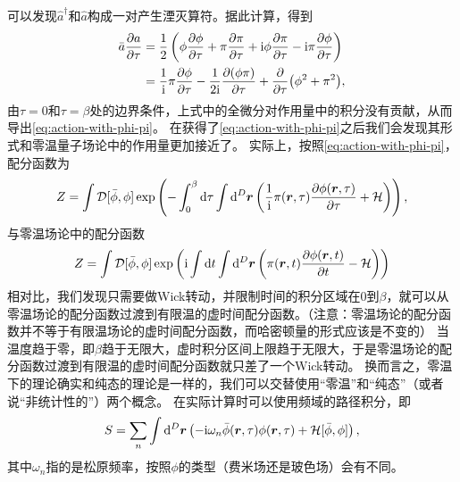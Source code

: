 \documentclass[hyperref, UTF8, a4paper]{ctexart}
\newcommand*{\ii}{\mathrm{i}}
\newcommand*{\fd}[1]{\mathcal{D}{#1}}
\begin{document}
可以发现$\hat{a}^\dagger$和$\hat{a}$构成一对产生湮灭算符。据此计算，得到
\[
    \begin{aligned}
        \bar{a} \pdv{a}{\tau} &= \frac{1}{2} \left( \phi \pdv{\phi}{\tau} + \pi \pdv{\pi}{\tau} + \ii \phi \pdv{\pi}{\tau} - \ii \pi \pdv{\phi}{\tau} \right) \\
        &= \frac{1}{\ii} \pi \pdv{\phi}{\tau} - \frac{1}{2\ii} \pdv{(\phi \pi)}{\tau} + \pdv{\tau} (\phi^2 + \pi^2), 
    \end{aligned}
\]
由$\tau=0$和$\tau=\beta$处的边界条件，上式中的全微分对作用量中的积分没有贡献，从而导出\eqref{eq:action-with-phi-pi}。
在获得了\eqref{eq:action-with-phi-pi}之后我们会发现其形式和零温量子场论中的作用量更加接近了。
实际上，按照\eqref{eq:action-with-phi-pi}，配分函数为
\begin{equation}
    Z = \int \fd{[\bar{\phi}, \phi]} \exp \left( - \int_0^\beta \dd{\tau} \int \dd[D]{\vb*{r}} \left( \frac{1}{\ii} \pi(\vb*{r}, \tau) \pdv{\phi(\vb*{r}, \tau)}{\tau} + \mathcal{H} \right) \right),
    \label{eq:path-integral-partition-function}
\end{equation}
与零温场论中的配分函数
\[
    Z = \int \fd{[\bar{\phi}, \phi]} \exp \left( \ii \int \dd{t} \int \dd[D]{\vb*{r}} \left( \pi(\vb*{r}, t) \pdv{\phi(\vb*{r}, t)}{t} - \mathcal{H} \right) \right)
\]
相对比，我们发现只需要做Wick转动，并限制时间的积分区域在$0$到$\beta$，就可以从零温场论的配分函数过渡到有限温的虚时间配分函数。（注意：零温场论的配分函数并不等于有限温场论的虚时间配分函数，而哈密顿量的形式应该是不变的）
当温度趋于零，即$\beta$趋于无限大，虚时积分区间上限趋于无限大，于是零温场论的配分函数过渡到有限温的虚时间配分函数就只差了一个Wick转动。
换而言之，零温下的理论确实和纯态的理论是一样的，我们可以交替使用“零温”和“纯态”（或者说“非统计性的”）两个概念。
在实际计算时可以使用频域的路径积分，即
\begin{equation}
    S = \sum_{n} \int \dd[D]{\vb*{r}} \left( - \ii \omega_n \bar{\phi}(\vb*{r}, \tau) \phi(\vb*{r}, \tau) + \mathcal{H}[\bar{\phi}, \phi] \right),
\end{equation}
其中$\omega_n$指的是松原频率，按照$\phi$的类型（费米场还是玻色场）会有不同。
\end{document}

